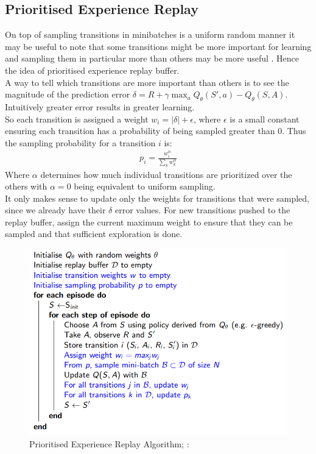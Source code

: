 \subsection{Prioritised Experience Replay}

On top of sampling transitions in minibatches is a uniform random manner it may be useful to note that some transitions might be more important for learning and 
sampling them in particular more than others may be more useful \cite{lecture_dqn}. Hence the idea of prioritised experience replay buffer. \\

A way to tell which transitions are more important than others is to see the magnitude of the prediction error $\delta = R + \gamma \max_a Q_{\theta}(S', a) - Q_{\theta}(S, A)$. 
Intuitively greater error results in greater learning.\\

So each transition is assigned a weight $w_i = |\delta| + \epsilon$, where $\epsilon$ is a small constant ensuring each transition has a probability of being sampled greater than 0. Thus the sampling probability for a transition $i$ is:
\begin{align}
    p_i = \frac{w_i^{\alpha}}{\sum_k w^{\alpha}_k}
\end{align}
Where $\alpha$ determines how much individual transitions are prioritized over the others with $\alpha = 0$ being equivalent to uniform sampling.\\

It only makes sense to update only the weights for transitions that were sampled, since we already have their $\delta$ error values\cite{lecture_dqn}. For new transitions pushed to the replay buffer, assign the current maximum weight to ensure that they can be sampled and that sufficient exploration is done.

\begin{figure}[h!]
  \centering
  \includegraphics[scale=0.5]{figures/prioritized_buffer.PNG}
  \caption{Prioritised Experience Replay Algorithm; \cite{lecture_dqn}: \cite{lecture_dqn}}
  \label{fig:replay_buffer}
\end{figure}
\newpage


